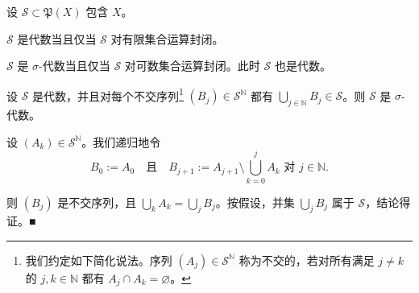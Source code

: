 \begin{remark}

设 $ \mathcal{S} \subset \mathfrak{P}(X) $ 包含 $ X $。

\begin{items}
\item

$ \mathcal{S} $ 是代数当且仅当 $ \mathcal{S} $ 对有限集合运算封闭。

\item

$ \mathcal{S} $ 是 $ \sigma $-代数当且仅当 $ \mathcal{S} $ 对可数集合运算封闭。此时 $ \mathcal{S} $ 也是代数。

\item

设 $ \mathcal{S} $ 是代数，并且对每个不交序列\footnote{我们约定如下简化说法。序列 $ (A_{j}) \in \mathcal{S}^{\mathbb{N}} $ 称为不交的，若对所有满足 $ j \ne k $ 的 $ j, k \in \mathbb{N} $ 都有 $ A_{j} \cap A_{k} = \varnothing $。} $ (B_{j}) \in \mathcal{S}^{\mathbb{N}} $ 都有 $ \bigcup_{j \in \mathbb{N}} B_{j} \in \mathcal{S} $。则 $ \mathcal{S} $ 是 $ \sigma $-代数。

\proofhead
设 $ (A_{k}) \in \mathcal{S}^{\mathbb{N}} $。我们递归地令
\[
B_{0} := A_{0} \quad \text{且} \quad B_{j+1} := A_{j+1} \setminus \bigcup_{k=0}^{j} A_{k} \text{ 对 } j \in \mathbb{N} .
\]

则 $ (B_{j}) $ 是不交序列，且 $ \bigcup_{k} A_{k} = \bigcup_{j} B_{j} $。按假设，并集 $ \bigcup_{j} B_{j} $ 属于 $ \mathcal{S} $，结论得证。\nobreak\hspace{0.35em}■

\end{items}

\end{remark}

